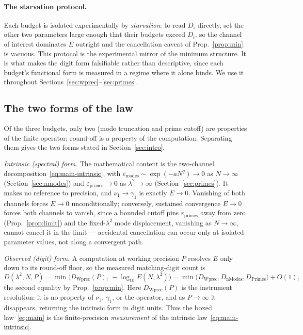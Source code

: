 \documentclass[11pt,a4paper]{article}
\begin{document}
\paragraph{The starvation protocol.}
Each budget is isolated experimentally by \emph{starvation}: to read $D_i$
directly, set the other two parameters large enough that their budgets exceed
$D_i$, so the channel of interest dominates $E$ outright and the cancellation
caveat of Prop.~\ref{prop:min} is vacuous. This protocol is the
experimental mirror of the minimum structure. It is what makes the digit form
falsifiable rather than descriptive, since each budget's functional form is
measured in a regime where it alone binds. We use it throughout
Sections~\ref{sec:wprec}--\ref{sec:primes}.

\subsection{The two forms of the law}\label{ssec:twoforms}

Of the three budgets, only two (mode truncation and prime cutoff) are
properties of the finite operator; round-off is a property of the computation.
Separating them gives the two forms stated in Section~\ref{sec:intro}.

\smallskip
\noindent\emph{Intrinsic (spectral) form.} The mathematical content is the
two-channel decomposition~\eqref{eq:main-intrinsic}, with
$\varepsilon_{\mathrm{modes}}\sim
\exp(-aN^{q})\to0$ as $N\to\infty$ (Section~\ref{sec:nmodes}) and
$\varepsilon_{\mathrm{primes}}\to0$ as $\lambda^2\to\infty$
(Section~\ref{sec:primes}). It makes no reference to precision, and
$\nu_1\to\gamma_1$ is exactly $E\to0$. Vanishing of both channels forces
$E\to0$ unconditionally; conversely, sustained convergence $E\to0$ forces both
channels to vanish, since a bounded cutoff pins $\varepsilon_{\mathrm{primes}}$
away from zero (Prop.~\ref{prop:limit}) and the fixed-$\lambda^2$ mode
displacement, vanishing as $N\to\infty$, cannot cancel it in the limit ---
accidental cancellation can occur only at isolated parameter values, not along
a convergent path.

\smallskip
\noindent\emph{Observed (digit) form.} A computation at working precision $P$
resolves $E$ only down to its round-off floor, so the measured matching-digit
count is
\begin{equation}\label{eq:observed}
  D(\lambda^2,N,P)=\min\!\bigl(D_{\mathrm{Wprec}}(P),\,-\log_{10}E(N,\lambda^2)\bigr)
   =\min\!\bigl(D_{\mathrm{Wprec}},D_{\mathrm{nModes}},D_{\mathrm{Primes}}\bigr)+O(1),
\end{equation}
the second equality by Prop.~\ref{prop:min}. Here $D_{\mathrm{Wprec}}(P)$
is the instrument resolution: it is no property of $\nu_1$, $\gamma_1$, or the
operator, and as $P\to\infty$ it disappears, returning the intrinsic form in
digit units. Thus the boxed law~\eqref{eq:main} is the finite-precision
\emph{measurement} of the intrinsic law~\eqref{eq:main-intrinsic}.
\end{document}
